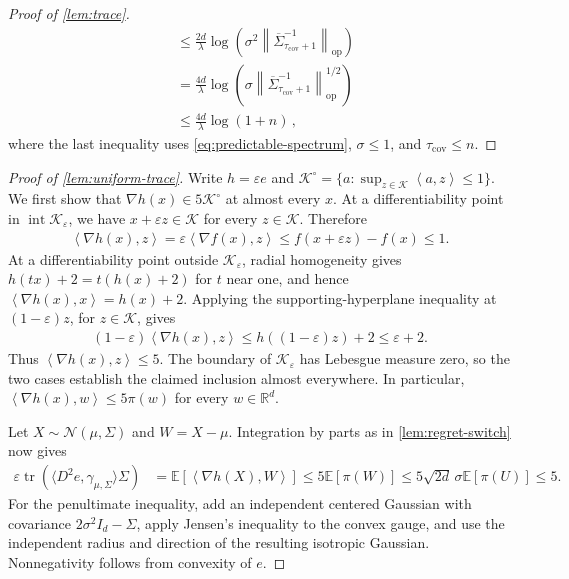 \documentclass[11pt]{article}
\newcommand{\R}{\mathbb R}
\newcommand{\E}{\mathbb E}
\newcommand{\K}{\mathcal K}
\newcommand{\N}{\mathcal N}
\newcommand{\tr}{\operatorname{tr}}
\newcommand{\op}{\mathrm{op}}
\newcommand{\1}{\mathbf 1}
\newcommand{\eps}{\varepsilon}
\newcommand{\ip}[2]{\left\langle #1,#2\right\rangle}
\newcommand{\norm}[1]{\left\lVert #1\right\rVert}
\begin{document}
\begin{proof}[Proof of \cref{lem:trace}]
\begin{align}
         & \leq
        \frac{2d}{\lambda}
        \log\left(
        \sigma^2
        \norm{\overline\Sigma_{\tau_{\mathrm{cov}}+1}^{-1}}_{\op}
        \right)                        \\
         & =
        \frac{4d}{\lambda}
        \log\left(
        \sigma
        \norm{\overline\Sigma_{\tau_{\mathrm{cov}}+1}^{-1}}_{\op}^{1/2}
        \right)                        \\
         & \leq
        \frac{4d}{\lambda}
        \log\left(1+n\right)\,,
    \end{align}
    where the last inequality
    uses \eqref{eq:predictable-spectrum},
    $\sigma\leq1$, and $\tau_{\mathrm{cov}}\leq n$.
\end{proof}


\begin{proof}[Proof of \cref{lem:uniform-trace}]
    Write $h=\eps e$ and
    $\K^\circ=\{a:\sup_{z\in\K}\ip{a}{z}\leq1\}$.
    We first show that $\nabla h(x)\in5\K^\circ$ at almost every $x$.
    At a differentiability point in $\operatorname{int}\K_\eps$, we have
    $x+\eps z\in\K$ for every $z\in\K$. Therefore
    \begin{align}
        \ip{\nabla h(x)}{z}
        =\eps\ip{\nabla f(x)}{z}
        \leq f(x+\eps z)-f(x)\leq1.
    \end{align}
    At a differentiability point outside $\K_\eps$, radial homogeneity
    gives $h(tx)+2=t(h(x)+2)$ for $t$ near one, and hence
    $\ip{\nabla h(x)}{x}=h(x)+2$. Applying the supporting-hyperplane
    inequality at $(1-\eps)z$, for $z\in\K$, gives
    \begin{align}
        (1-\eps)\ip{\nabla h(x)}{z}
        \leq h((1-\eps)z)+2\leq\eps+2.
    \end{align}
    Thus $\ip{\nabla h(x)}{z}\leq5$. The boundary of $\K_\eps$ has
    Lebesgue measure zero, so the two cases establish the claimed
    inclusion almost everywhere. In particular,
    $\ip{\nabla h(x)}{w}\leq5\pi(w)$ for every $w\in\R^d$.

    Let $X\sim\N(\mu,\Sigma)$ and $W=X-\mu$. Integration by parts as
    in \cref{lem:regret-switch} now gives
    \begin{align}
        \eps\tr\left(\langle D^2e,\gamma_{\mu,\Sigma}\rangle\Sigma\right)
         & =\E\left[\ip{\nabla h(X)}{W}\right]
        \leq5\E[\pi(W)]
        \leq5\sqrt{2d}\,\sigma\E[\pi(U)]
        \leq5.
    \end{align}
    For the penultimate inequality, add an independent centered Gaussian
    with covariance $2\sigma^2I_d-\Sigma$, apply Jensen's inequality to
    the convex gauge, and use the independent radius and direction of
    the resulting isotropic Gaussian. Nonnegativity follows from
    convexity of $e$.
\end{proof}
\end{document}
